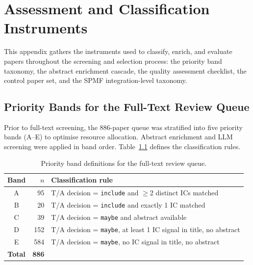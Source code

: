 \chapter{Assessment and Classification Instruments}
\label{app:H}

This appendix gathers the instruments used to classify, enrich, and evaluate
papers throughout the screening and selection process: the priority band
taxonomy, the abstract enrichment cascade, the quality assessment checklist,
the control paper set, and the SPMF integration-level taxonomy.

\section{Priority Bands for the Full-Text Review Queue}
\label{app:slr-bands}

Prior to full-text screening, the 886-paper queue was stratified into five
priority bands (A--E) to optimise resource allocation. Abstract enrichment
and LLM screening were applied in band order.
Table~\ref{tab:app-bands} defines the classification rules.

\begin{table}[htbp]
\centering
\caption{Priority band definitions for the full-text review queue.}
\label{tab:app-bands}
\small
\setlength{\tabcolsep}{4pt}
\begin{tabular}{c r p{8.5cm}}
\toprule
\textbf{Band} & \textbf{$n$} & \textbf{Classification rule} \\
\midrule
A &  95 & T/A decision = \texttt{include} and $\geq$2 distinct ICs matched \\
B &  20 & T/A decision = \texttt{include} and exactly 1 IC matched \\
C &  39 & T/A decision = \texttt{maybe} and abstract available \\
D & 152 & T/A decision = \texttt{maybe}, at least 1 IC signal in title, no abstract \\
E & 584 & T/A decision = \texttt{maybe}, no IC signal in title, no abstract \\
\midrule
\textbf{Total} & \textbf{886} & \\
\bottomrule
\end{tabular}
\end{table}

